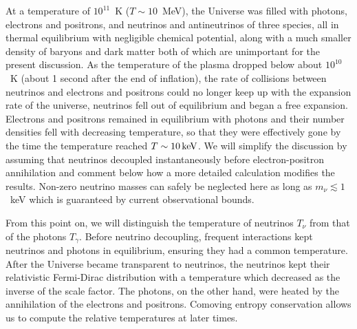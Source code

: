 At a temperature of $10^{11}$~K ($T\sim10$~MeV), the Universe was filled with photons, electrons and positrons, and neutrinos and antineutrinos of three species, all in thermal equilibrium with negligible chemical potential, along with a much smaller density of baryons and dark matter both of which are unimportant for the present discussion.  As the temperature of the plasma dropped below about $10^{10}$~K (about 1 second after the end of inflation), the rate of collisions between neutrinos and electrons and positrons could no longer keep up with the expansion rate of the universe, neutrinos fell out of equilibrium and began a free expansion.  Electrons and positrons remained in equilibrium with photons and their number densities fell with decreasing temperature, so that they were effectively gone by the time the temperature reached $ T \sim 10\,{\rm keV}$.  We will simplify the discussion by assuming that neutrinos decoupled instantaneously before electron-positron annihilation and comment below how a more detailed calculation modifies the results.  Non-zero neutrino masses can safely be neglected here as long as $m_\nu \lesssim1$~keV which is guaranteed by current observational bounds.

From this point on, we will distinguish the temperature of neutrinos $T_\nu$ from that of the photons $T_\gamma$.  Before neutrino decoupling, frequent interactions kept neutrinos and photons in equilibrium, ensuring they had a common temperature.  After the Universe became transparent to neutrinos, the neutrinos kept their relativistic Fermi-Dirac distribution with a temperature which decreased as the inverse of the scale factor.  The photons, on the other hand, were heated by the annihilation of the electrons and positrons.  Comoving entropy conservation allows us to compute the relative temperatures at later times.

